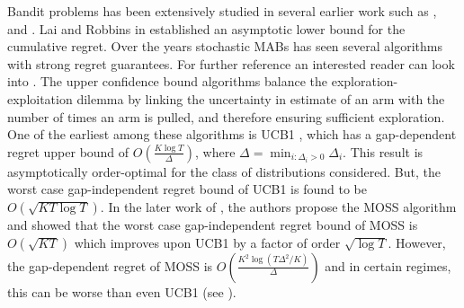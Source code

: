 
	Bandit problems has been extensively studied in several earlier work such as \cite{thompson1933likelihood}, \cite{robbins1952some} and \cite{lai1985asymptotically}. Lai and Robbins in  \cite{lai1985asymptotically} established an asymptotic lower bound for the cumulative regret. Over the years stochastic MABs has seen several algorithms with strong regret guarantees. For further reference an interested reader can look into \cite{bubeck2012regret}. The upper confidence bound algorithms balance the exploration-exploitation dilemma by linking the uncertainty in estimate of an arm with the number of times an arm is pulled, and therefore ensuring sufficient exploration. One of the earliest among these algorithms is UCB1 \cite{auer2002finite}, which has a gap-dependent regret upper bound of  $O\left(\frac{K\log T}{\Delta}\right)$, where $\Delta = \min_{i:\Delta_i>0} \Delta_i$. This result is asymptotically order-optimal for the class of distributions considered. But, the worst case gap-independent regret bound of UCB1 is found to be  $O \left(\sqrt{KT\log T}\right)$. In the later work of \cite{audibert2009minimax}, the authors propose the MOSS algorithm and showed that the worst case gap-independent regret bound of MOSS is $O\left( \sqrt{KT} \right)$ which improves upon UCB1 by a factor of order $\sqrt{\log T}$. However, the gap-dependent regret of MOSS is $O\left( \frac{K^{2}\log\left(T\Delta^{2}/K\right)}{\Delta}\right)$ and in certain regimes, this can be worse than even UCB1 (see \cite{audibert2009minimax,lattimore2015optimally}).
	
